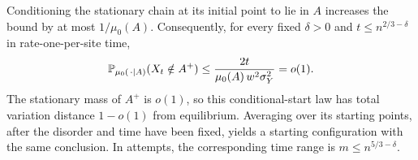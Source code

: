 Conditioning the stationary chain at its initial point to lie
in $A$ increases the bound by at most $1/\mu_0(A)$.
Consequently, for every fixed $\delta>0$ and
$t\le n^{2/3-\delta}$ in rate-one-per-site time,
\[
 \mathbb P_{\mu_0(\,\cdot\mid A)}(X_t\notin A^+)
 \le\frac{2t}{\mu_0(A)\,w^2\sigma_Y^2}=o(1).
\]
The stationary mass of $A^+$ is $o(1)$, so this conditional-start
law has total variation distance $1-o(1)$ from equilibrium.
Averaging over its starting points, after the disorder and time have
been fixed, yields a starting configuration with the same conclusion.
In attempts, the corresponding time
range is $m\le n^{5/3-\delta}$.
